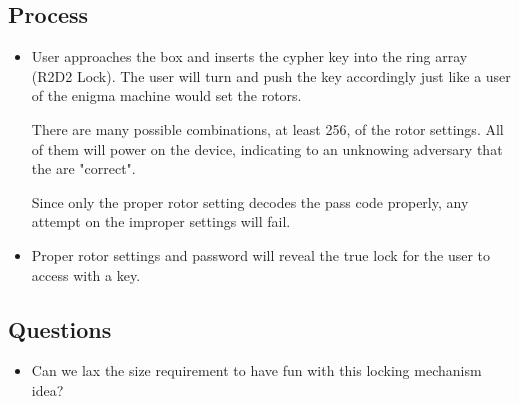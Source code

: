 \documentclass[]{scrartcl}
\begin{document}
\subsection{Process}

\begin{itemize}
	\item User approaches the box and inserts the cypher key into the ring array (R2D2 Lock).  The user will turn and push the key accordingly just like a user of the enigma machine would set the rotors.  
	
	\subitem There are many possible combinations, at least 256, of the rotor settings.  All of them will power on the device, indicating to an unknowing adversary that the are "correct".  
	
	\subitem Since only the proper rotor setting decodes the pass code properly, any attempt on the improper settings will fail.
	
	\item Proper rotor settings and password will reveal the true lock for the user to access with a key.
\end{itemize}



\subsection{Questions}


\begin{itemize}
	\item Can we lax the size requirement to have fun with this locking mechanism idea?
\end{itemize}
\end{document}
